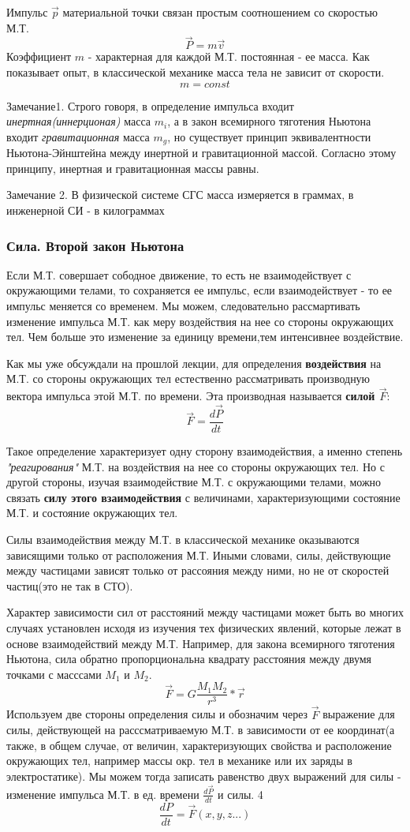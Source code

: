 \documentclass{article}
\begin{document}
Импульс $\vec{p}$ материальной точки связан простым соотношением со скоростью М.Т. 
$$\vec{P} = m\vec{v}$$
Коэффициент $m$ - характерная для каждой М.Т. постоянная - ее масса. Как показывает опыт, в классической механике масса тела не зависит от скорости. $$m= const$$

Замечание1. Строго говоря, в определение импульса входит \emph{инертная(иннерционая)} масса $m_i$, а в закон всемирного тяготения Ньютона входит \emph{гравитационная} масса $m_g$, но существует принцип эквивалентности Ньютона-Эйнштейна между инертной и гравитационной массой. Согласно этому принципу, инертная и гравитационная массы равны.

Замечание 2. В физической системе СГС масса измеряется в граммах, в инженерной СИ - в килограммах

\subsubsection{Сила. Второй закон Ньютона}
Если М.Т. совершает сободное движение, то есть не взаимодействует с окружающими телами, то сохраняется ее импульс, если взаимодействует - то ее импульс меняется со временем. Мы можем, следовательно рассмартивать изменение импульса М.Т. как меру воздействия на нее со стороны окружающих тел. Чем больше это изменение за единицу времени,тем интенсивнее воздействие.

Как мы уже обсуждали на прошлой лекции, для определения \textbf{воздействия }на М.Т. со стороны окружающих тел естественно рассматривать производную вектора импульса этой М.Т. по времени. Эта производная называется \textbf{силой $\vec F$}:
$$\vec F = \frac{d\vec{P}}{dt}$$


Такое определение характеризует одну сторону взаимодействия, а именно степень \emph{"реагирования"} М.Т. на воздействия на нее со стороны окружающих тел. Но с другой стороны, изучая взаимодействие М.Т. с окружающими телами, можно связать \textbf{силу этого взаимодействия} с величинами, характеризующими состояние М.Т. и состояние окружающих тел. 

Силы взаимодействия между М.Т. в классической механике оказываются зависящими только от расположения М.Т. Иными словами, силы, действующие между частицами зависят только от рассояния между ними, но не от скоростей частиц(это не так в СТО).

Характер зависимости сил от расстояний между частицами может быть во многих случаях установлен исходя из изучения тех физических явлений, которые лежат в основе взаимодействий между М.Т. Например, для закона всемирного тяготения Ньютона, сила обратно пропорциональна квадрату расстояния между двумя точками с масссами $M_1$ и $M_2$.
$$\vec{F} = G\frac{M_1 M_2}{r^3}*\vec{r}$$
Используем две стороны определения силы и обозначим через $\vec F$ выражение для силы, действующей на расссматриваемую М.Т. в зависимости от ее координат(а также, в общем случае, от величин, характеризующих свойства и расположение окружающих тел, например массы окр. тел в механике или их заряды в электростатике). Мы можем тогда записать равенство двух выражений для силы - изменение импульса М.Т. в ед. времени $\frac{d\vec P}{dt}$ и силы.
4$$\frac{dP}{dt} = \vec F(x,y,z...)$$
\end{document}
